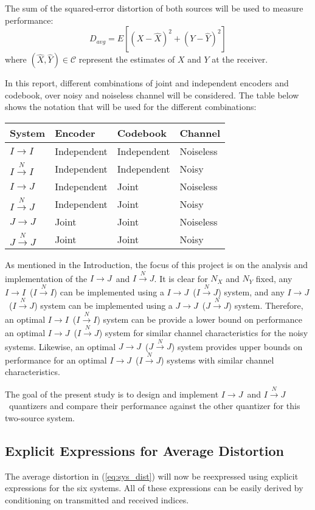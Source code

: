 \documentclass[10pt]{article}
\newcommand{\sysIIN}{\mbox{$I \overset{N}{\rightarrow} I$}}
\newcommand{\sysII}{\mbox{$I \rightarrow I$}}
\newcommand{\sysIJN}{\mbox{$I \overset{N}{\rightarrow} J$}}
\newcommand{\sysIJ}{\mbox{$I \rightarrow J$}}
\newcommand{\sysJJN}{\mbox{$J \overset{N}{\rightarrow} J$}}
\newcommand{\sysJJ}{\mbox{$J \rightarrow J$}}
\begin{document}
The sum of the squared-error distortion of both sources will be used to measure performance:
\begin{equation}
\label{eq:sys_dist}
    D_{avg} = E[{(X-\hat{X})}^2 + {(Y-\hat{Y})}^2]
\end{equation}
where $(\hat X, \hat Y) \in \mathcal{C}$ represent the estimates of $X$ and $Y$ at the receiver.

In this report, different combinations of joint and independent encoders and codebook, over noisy and noiseless channel will be considered. The table below shows the notation that will be used for the different combinations:
\begin{center}
    \begin{tabular}{| l | l | l | l |}
    \hline
    \bf System & \bf Encoder & \bf Codebook & \bf Channel \\ \hline \hline
    \sysII & Independent & Independent & Noiseless \\ \hline
    \sysIIN & Independent & Independent & Noisy \\ \hline
    \sysIJ & Independent & Joint & Noiseless \\ \hline
    \sysIJN & Independent & Joint & Noisy \\ \hline
    \sysJJ & Joint & Joint & Noiseless \\ \hline
    \sysJJN & Joint & Joint & Noisy \\ \hline
    \end{tabular}
\end{center}

As mentioned in the Introduction, the focus of this project is on the analysis and implementation of the \sysIJ\ and \sysIJN. It is clear for $N_X$ and $N_Y$ fixed, any \sysII\ (\sysIIN) can be implemented using a \sysIJ\ (\sysIJN) system, and any \sysIJ\ (\sysIJN) system can be implemented using a \sysJJ\ (\sysJJN) system. Therefore, an optimal \sysII\ (\sysIIN) system can be  provide a lower bound on performance an optimal \sysIJ\ (\sysIJN) system for similar channel characteristics for the noisy systems. Likewise, an optimal \sysJJ\ (\sysJJN) system provides upper bounds on performance for an optimal \sysIJ\ (\sysIJN) systems with similar channel characteristics.

The goal of the present study is to design and implement \sysIJ\ and \sysIJN\ quantizers and compare their performance against the other quantizer for this two-source system.

\subsection{Explicit Expressions for Average Distortion}
The average distortion in (\ref{eq:sys_dist}) will now be reexpressed using explicit expressions for the six systems. All of these expressions can be easily derived by conditioning on transmitted and received indices. 
\end{document}
